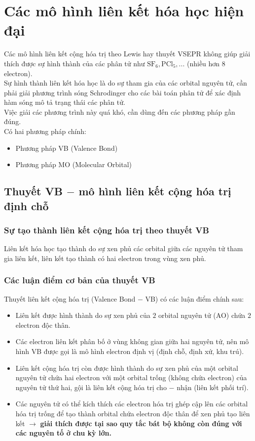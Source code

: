 \chapter{Các mô hình liên kết hóa học hiện đại}
Các mô hình liên kết cộng hóa trị theo Lewis hay thuyết VSEPR không giúp giải thích được sự hình thành của các phân tử như $\mathrm{SF_6}, \mathrm{PCl_5}, ...$ (nhiều hơn $8$ electron).\\
Sự hình thành liên kết hóa học là do sự tham gia của các orbital nguyên tử, cần phải giải phương trình sóng Schrodinger cho các bài toán phân tử để xác định hàm sóng mô tả trạng thái các phân tử.\\
Việc giải các phương trình này quá khó, cần dùng đến các phương pháp gần đúng.\\
Có hai phương pháp chính:
\begin{itemize}
\item Phương pháp VB (Valence Bond)
\item Phương pháp MO (Molecular Orbital)
\end{itemize}
\section{Thuyết VB $-$ mô hình liên kết cộng hóa trị định chỗ}
\subsection{Sự tạo thành liên kết cộng hóa trị theo thuyết VB}
Liên kết hóa học tạo thành do sự xen phủ các orbital giữa các nguyên tử tham gia liên kết, liên kết tạo thành có hai electron trong vùng xen phủ.
\subsection{Các luận điểm cơ bản của thuyết VB}
Thuyết liên kết cộng hóa trị (Valence Bond $-$ VB) có các luận điểm chính sau:
\begin{itemize}
\item Liên kết được hình thành do sự xen phủ của $2$ orbital nguyên tử (AO) chứa $2$ electron độc thân.
\item Các electron liên kết phân bố ở vùng không gian giữa hai nguyên tử, nên mô hình VB được gọi là mô hình electron định vị (định chỗ, định xứ, khu trú).
\item Liên kết cộng hóa trị còn được hình thành do sự xen phủ của một orbital nguyên tử chứa hai electron với một orbital trống (không chứa electron) của nguyên tử thứ hai, gội là liên kết cộng hóa trị cho $-$ nhận (liên kết phối trí).
\item Các nguyên tử có thể kích thích các electron hóa trị ghép cập lên các orbital hóa trị trống để tạo thành orbital chứa electron độc thân để xen phủ tạo liên kết $\to$ \textbf{giải thích được tại sao quy tắc bát bộ không còn đúng với các nguyên tố ở chu kỳ lớn.}
\end{itemize}
